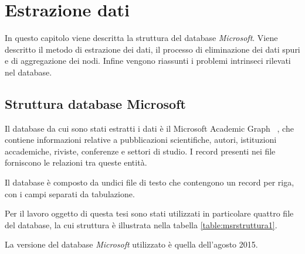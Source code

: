 \documentclass[12pt,a4paper,twoside]{report}
\begin{document}
\whitePage
\chapter{Estrazione dati} \label{cap:estrazione}

In questo capitolo viene descritta la struttura del database \textit{Microsoft}. Viene descritto il
metodo di estrazione dei dati, il processo di eliminazione dei dati spuri e di aggregazione dei
nodi. Infine vengono riassunti i problemi intrinseci rilevati nel database.

\section{Struttura database Microsoft} \label{sec:msr}
Il database da cui sono stati estratti i dati è il Microsoft Academic Graph~
\cite{Sinha:2015:OMA:2740908.2742839}, che contiene informazioni relative a pubblicazioni
scientifiche, autori, istituzioni accademiche, riviste, conferenze e settori di studio. I record
presenti nei file forniscono le relazioni tra queste entità.

Il database è composto da undici file di testo che contengono un record per riga, con i campi
separati da tabulazione.

Per il lavoro oggetto di questa tesi sono stati utilizzati in particolare quattro file del database,
la cui struttura è illustrata nella tabella \ref{table:msrstruttura1}.

La versione del database \textit{Microsoft} utilizzato è quella dell'agosto 2015.
\end{document}
